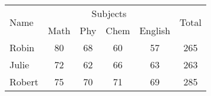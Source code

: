 \documentclass[a4paper]{article}
\begin{document}
    \begin{tabular}{|l|*{5}{c|}}
        \hline \multirow{2}{*}{Name}& \multicolumn{4}{c|}{Subjects}&
        \multirow{2}{*}{Total}\\
        \cline{2-5} & Math & Phy & Chem & English & \\
        \hline
        \hline Robin & 80 & 68 & 60 & 57 & 265\\
        \hline Julie & 72 & 62 & 66 & 63 & 263\\
        \hline Robert & 75 & 70 & 71 & 69 & 285\\
        \hline
    \end{tabular}

    
\end{document}
